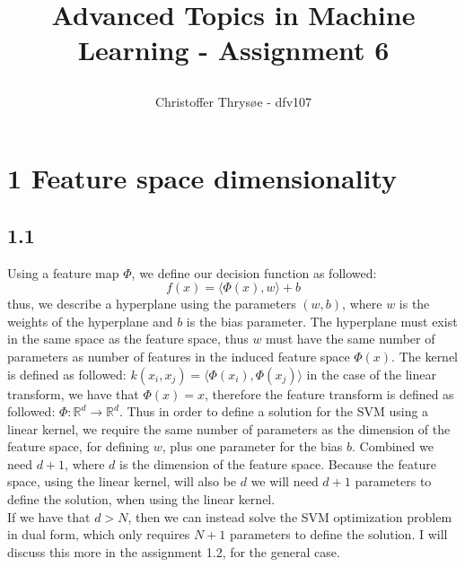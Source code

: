 \documentclass{article}
\title{
\vspace{1in}
\textmd{\textbf{Advanced Topics in Machine Learning - Assignment 6}} \\
\author{Christoffer Thrysøe - dfv107}
}
\begin{document}
\maketitle
{}

\section{1 Feature space dimensionality}
\subsection{1.1}
Using a feature map $\Phi$, we define our decision function as followed:
\begin{equation}
f(x) = \langle \Phi(x),w \rangle + b
\end{equation}
thus, we describe a hyperplane using the parameters $(w,b)$, where $w$ is the weights of the hyperplane and $b$ is the bias parameter. The hyperplane must exist in the same space as the feature space, thus $w$ must have the same number of parameters as number of features in the induced feature space $\Phi(x)$. The kernel is defined as followed:
$
k(x_i,x_j) = \langle \Phi(x_i), \Phi(x_j) \rangle
$
in the case of the linear transform, we have that $\Phi(x) = x$, therefore the feature transform is defined as followed: $\Phi: \mathbb{R}^d \rightarrow \mathbb{R}^d$. Thus in order to define a solution for the SVM using a linear kernel, we require the same number of parameters as the dimension of the feature space, for defining $w$, plus one parameter for the bias $b$. Combined we need $d+1$, where $d$ is the dimension of the feature space. Because the feature space, using the linear kernel, will also be $d$ we will need $d+1$ parameters to define the solution, when using the linear kernel. \\
If we have that $d > N$, then we can instead solve the SVM optimization problem in dual form, which only requires $N+1$ parameters to define the solution. I will discuss this more in the assignment 1.2, for the general case.
\end{document}
